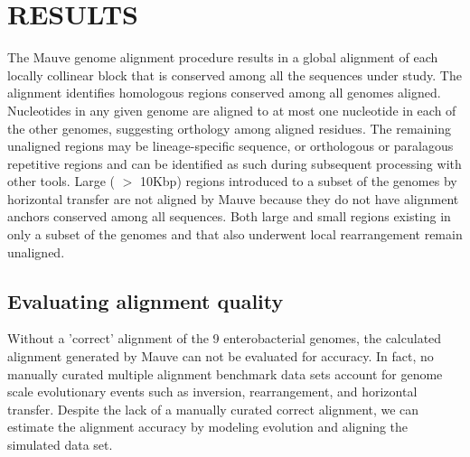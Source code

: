 \documentclass[titlepage,11pt]{article}
\begin{document}
\section*{ RESULTS }
The Mauve genome alignment procedure results in a global alignment of each
locally collinear block that is conserved among all the sequences under study.
The alignment identifies homologous regions conserved among all genomes
aligned.  Nucleotides in any given genome are aligned to at most one nucleotide
in each of the other genomes, suggesting orthology among aligned residues. 
The remaining unaligned regions may be lineage-specific sequence, or orthologous
or paralagous repetitive regions and can be identified as such during subsequent
processing with other tools.  Large ( $>$ 10Kbp) regions introduced to a subset
of the genomes by horizontal transfer are not aligned by Mauve because
they do not have alignment anchors conserved among all sequences.  Both large
and small regions existing in only a subset of the genomes and that also underwent
local rearrangement remain unaligned.

%

\subsection*{Evaluating alignment quality}
Without a 'correct' alignment of the 9 enterobacterial genomes, the calculated
alignment generated by Mauve can not be evaluated for accuracy.  In fact, no
manually curated multiple alignment benchmark data sets account for genome scale
evolutionary events such as inversion, rearrangement, and horizontal transfer.
Despite the lack of a manually curated correct alignment, we can estimate the
alignment accuracy by modeling evolution and aligning the simulated data set.
\end{document}
